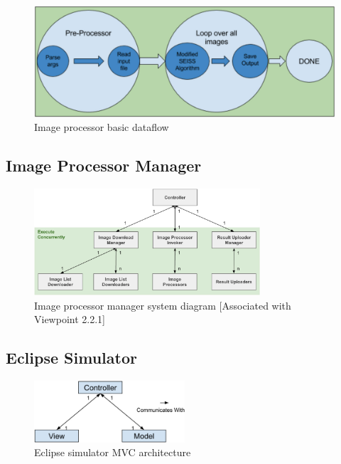 \documentclass[10pt, onecolumn, draftclsnofoot, letterpaper, compsoc]{IEEEtran}
\begin{document}
\begin{figure}[H]
    \centering
    \includegraphics[width=\textwidth]{george_fig.eps}
    \caption{Image processor basic dataflow}
\end{figure}

\subsection{Image Processor Manager}

\begin{figure}[H]
    \centering
    \includegraphics[width=0.75\textwidth]{bret_fig.eps}
    \caption{Image processor manager system diagram [Associated with Viewpoint 2.2.1]}
\end{figure}

\subsection{Eclipse Simulator}

\begin{figure}[H]
    \centering
    \includegraphics[width=0.5\textwidth]{jake_fig.eps}
    \caption{Eclipse simulator MVC architecture}
\end{figure}
\end{document}
